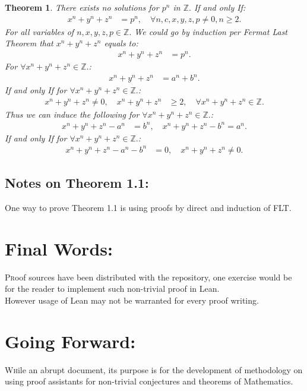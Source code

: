 \documentclass[10pt]{article}
\theoremstyle{plain}
\newtheorem{theorem}{Theorem}[section]
\theoremstyle{definition}
\theoremstyle{remark}
\begin{document}
	\begin{theorem}
		There exists no solutions for $p^{n}$ in $\mathbb{Z}.$ If and only If:
		\begin{align*}
			x^{n} + y^{n} + z^{n} &= p^{n}, \quad \forall n, c, x, y, z, p \neq 0, n \geq 2.
		\end{align*}
		For all variables of $n, x, y, z, p \in \mathbb{Z}.$ We could go by induction per Fermat Last Theorem that $x^{n} + y^{n} + z^{n}$ equals to:	
		\begin{align*}
			x^{n} + y^{n} + z^{n} &= p^{n}.
		\end{align*}
		For $\forall x^{n} + y^{n} + z^{n} \in \mathbb{Z}.$:
		\begin{align*}
			x^{n} + y^{n} + z^{n} &= a^{n} + b^{n}.
		\end{align*}
		If and only If for $\forall x^{n} + y^{n} + z^{n} \in \mathbb{Z}.$:
		\begin{align*}
			x^{n} + y^{n} + z^{n} \neq 0, \quad x^{n} + y^{n} + z^{n} &\geq 2, \quad \forall x^{n} + y^{n} + z^{n} \in \mathbb{Z}.
		\end{align*}
		Thus we can induce the following for $\forall x^{n} + y^{n} + z^{n} \in \mathbb{Z}.$:
		\begin{align*}
			x^{n} + y^{n} + z^{n} -  a^{n} &= b^{n}, \quad x^{n} + y^{n} + z^{n} - b^{n} = a^{n}.
		\end{align*}
		If and only If for $\forall x^{n} + y^{n} + z^{n} \in \mathbb{Z}.$:
		\begin{align*}
			x^{n} + y^{n} + z^{n} -  a^{n} - b^{n} &= 0, \quad x^{n} + y^{n} + z^{n} \neq 0.
		\end{align*}
	\end{theorem}
	\subsection{Notes on Theorem 1.1:}
	One way to prove Theorem 1.1 is using proofs by direct and induction of FLT.
	\section{Final Words:}
	\lettrine[lines=1, lhang=0.1, loversize=0.2]{P}roof sources have been distributed with the repository, one exercise would be for the reader to implement such non-trivial proof in Lean.\\However usage of Lean may not be warranted for every proof writing.
	\section{Going Forward:}
	\lettrine[lines=1, lhang=0.1, loversize=0.2]{W}hile an abrupt document, its purpose is for the development of methodology on using proof assistants for non-trivial conjectures and theorems of Mathematics.
	
\nocite{*}
	


	
	
\end{document}
